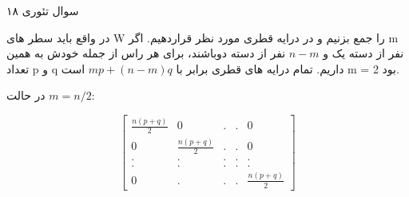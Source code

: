 سوال تئوری ۱۸

در واقع باید سطر های W را جمع بزنیم و در درایه قطری مورد نظر قراردهیم. 
اگر m نفر از دسته یک و $n - m$ نفر از دسته دوباشند، برای هر راس از جمله خودش  به همین تعداد p و q داریم.
تمام درایه های قطری برابر با $ mp + (n-m)q $ است
m = 2 بود.

در حالت $ m = n/2 $:

$$\begin{bmatrix}
\frac{n(p+q)}{2} & 0 & . & . & 0\\ 
 0& \frac{n(p+q)}{2} &  .& . &0 \\ 
 .&  .& . & . & .\\ 
 .&  .&  .&  .& .\\ 
 0&  .&  .&  .& \frac{n(p+q)}{2}
\end{bmatrix}$$